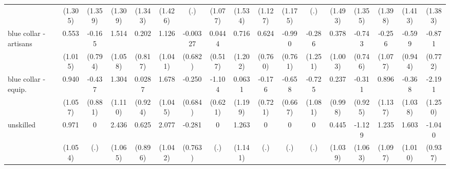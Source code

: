 {\begin{tabular}{l*{16}{c}}
                    &     (1.305)         &     (1.359)         &     (1.309)         &     (1.343)         &     (1.426)         &         (.)         &     (1.077)         &     (1.534)         &     (1.127)         &     (1.175)         &         (.)         &     (1.493)         &     (1.355)         &     (1.398)         &     (1.413)         &     (1.383)         \\
[1em]
blue collar - artisans&       0.553         &      -0.165         &       1.514         &       0.202         &       1.126         &    -0.00327         &      0.0444         &       0.716         &       0.624         &      -0.990         &      -0.286         &       0.378         &      -0.743         &      -0.256         &      -0.599         &      -0.871         \\
                    &     (1.015)         &     (0.794)         &     (1.058)         &     (0.817)         &     (1.041)         &     (0.682)         &     (0.517)         &     (1.202)         &     (0.760)         &     (0.761)         &     (1.251)         &     (1.003)         &     (0.746)         &     (1.077)         &     (0.944)         &     (0.772)         \\
[1em]
blue collar - equip.&       0.940         &      -0.437         &       1.304         &      0.0287         &       1.678         &      -0.250         &      -1.104         &      0.0631         &      -0.176         &      -0.658         &      -0.725         &       0.237         &      -0.311         &       0.896         &      -0.368         &      -2.191         \\
                    &     (1.057)         &     (0.881)         &     (1.110)         &     (0.924)         &     (1.045)         &     (0.684)         &     (0.621)         &     (1.199)         &     (0.721)         &     (0.667)         &     (1.081)         &     (0.998)         &     (0.925)         &     (1.137)         &     (1.038)         &     (1.250)         \\
[1em]
unskilled           &       0.971         &           0         &       2.436\sym{*}  &       0.625         &       2.077\sym{*}  &      -0.281         &           0         &       1.263         &           0         &           0         &           0         &       0.445         &      -1.129         &       1.235         &       1.603         &      -1.040         \\
                    &     (1.054)         &         (.)         &     (1.065)         &     (0.896)         &     (1.042)         &     (0.763)         &         (.)         &     (1.141)         &         (.)         &         (.)         &         (.)         &     (1.039)         &     (1.063)         &     (1.097)         &     (1.010)         &     (0.937)         \\

\end{tabular}}
